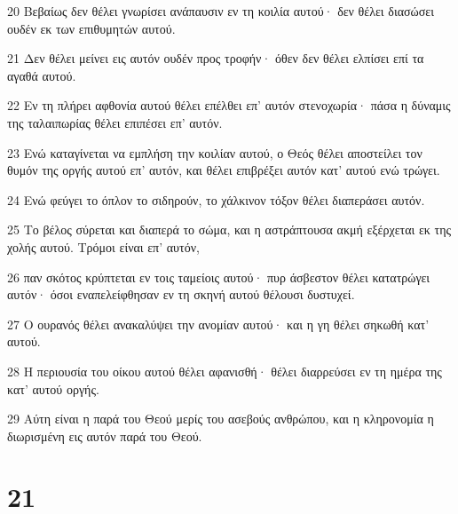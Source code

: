 \par 20 Βεβαίως δεν θέλει γνωρίσει ανάπαυσιν εν τη κοιλία αυτού· δεν θέλει διασώσει ουδέν εκ των επιθυμητών αυτού.
\par 21 Δεν θέλει μείνει εις αυτόν ουδέν προς τροφήν· όθεν δεν θέλει ελπίσει επί τα αγαθά αυτού.
\par 22 Εν τη πλήρει αφθονία αυτού θέλει επέλθει επ' αυτόν στενοχωρία· πάσα η δύναμις της ταλαιπωρίας θέλει επιπέσει επ' αυτόν.
\par 23 Ενώ καταγίνεται να εμπλήση την κοιλίαν αυτού, ο Θεός θέλει αποστείλει τον θυμόν της οργής αυτού επ' αυτόν, και θέλει επιβρέξει αυτόν κατ' αυτού ενώ τρώγει.
\par 24 Ενώ φεύγει το όπλον το σιδηρούν, το χάλκινον τόξον θέλει διαπεράσει αυτόν.
\par 25 Το βέλος σύρεται και διαπερά το σώμα, και η αστράπτουσα ακμή εξέρχεται εκ της χολής αυτού. Τρόμοι είναι επ' αυτόν,
\par 26 παν σκότος κρύπτεται εν τοις ταμείοις αυτού· πυρ άσβεστον θέλει κατατρώγει αυτόν· όσοι εναπελείφθησαν εν τη σκηνή αυτού θέλουσι δυστυχεί.
\par 27 Ο ουρανός θέλει ανακαλύψει την ανομίαν αυτού· και η γη θέλει σηκωθή κατ' αυτού.
\par 28 Η περιουσία του οίκου αυτού θέλει αφανισθή· θέλει διαρρεύσει εν τη ημέρα της κατ' αυτού οργής.
\par 29 Αύτη είναι η παρά του Θεού μερίς του ασεβούς ανθρώπου, και η κληρονομία η διωρισμένη εις αυτόν παρά του Θεού.

\chapter{21}

